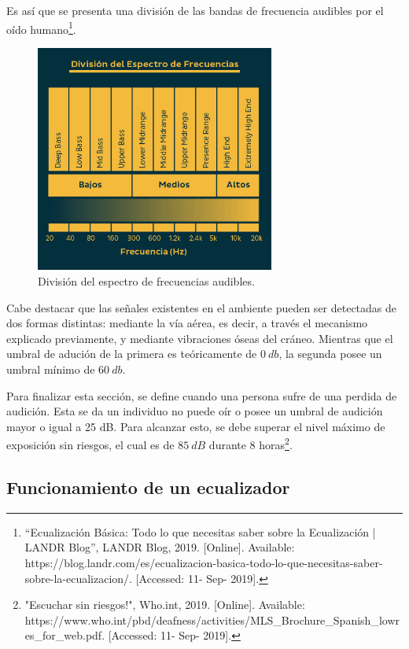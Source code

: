 \documentclass[a4paper]{article}
\begin{document}
Es así que se presenta una división de las bandas de frecuencia audibles por el oído humano\footnote{``Ecualización Básica: Todo lo que necesitas saber sobre la Ecualización | LANDR Blog'', LANDR Blog, 2019. [Online]. Available: https://blog.landr.com/es/ecualizacion-basica-todo-lo-que-necesitas-saber-sobre-la-ecualizacion/. [Accessed: 11- Sep- 2019].}.
\begin{figure}[H]
\centering
	\includegraphics[width=0.7\textwidth]{Imagenes/FrequencySpectrumDivision.png}
	\caption{División del espectro de frecuencias audibles.}
	\label{fig:divfreq}
\end{figure}

Cabe destacar que las señales existentes en el ambiente pueden ser detectadas de dos formas distintas: mediante la vía aérea, es decir, a través el mecanismo explicado previamente, y mediante vibraciones óseas del cráneo. Mientras que el umbral de adución de la primera es teóricamente de $0 \ db$, la segunda posee un umbral mínimo de $60 \ db$. 

Para finalizar esta sección, se define cuando una persona sufre de una perdida de audición. Esta se da un individuo no puede oír o posee un umbral de audición mayor o igual a 25 dB. Para alcanzar esto, se debe superar el nivel máximo de exposición sin riesgos, el cual es de $85 \ dB$ durante 8 horas\footnote{"Escuchar sin riesgos!", Who.int, 2019. [Online]. Available: https://www.who.int/pbd/deafness/activities/MLS\_Brochure\_Spanish\_lowres\_for\_web.pdf. [Accessed: 11- Sep- 2019].}.

\subsection{Funcionamiento de un ecualizador}
\end{document}
